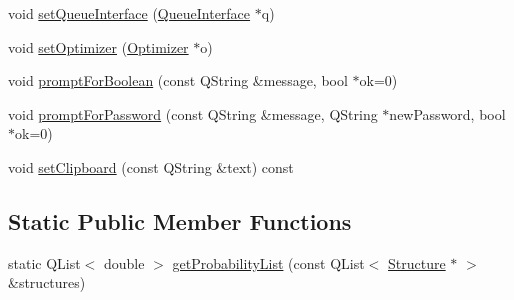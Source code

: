 \begin{DoxyCompactItemize}
\item 
void \hyperlink{classGlobalSearch_1_1OptBase_add9178a3bfd695f1d42191a328956451}{set\+Queue\+Interface} (\hyperlink{classGlobalSearch_1_1QueueInterface}{Queue\+Interface} $\ast$q)
\item 
void \hyperlink{classGlobalSearch_1_1OptBase_addd46a192c8a68553a12b30d18246f1e}{set\+Optimizer} (\hyperlink{classGlobalSearch_1_1Optimizer}{Optimizer} $\ast$o)
\item 
void \hyperlink{classGlobalSearch_1_1OptBase_a3460f008a4a3cc3f8d00b3c0cd531069}{prompt\+For\+Boolean} (const Q\+String \&message, bool $\ast$ok=0)
\item 
void \hyperlink{classGlobalSearch_1_1OptBase_a934195fac431de2882383b0483505c95}{prompt\+For\+Password} (const Q\+String \&message, Q\+String $\ast$new\+Password, bool $\ast$ok=0)
\item 
void \hyperlink{classGlobalSearch_1_1OptBase_a3a509ee5a0aa4d8021dcb2d1bc34f1c1}{set\+Clipboard} (const Q\+String \&text) const 
\end{DoxyCompactItemize}
\subsection*{Static Public Member Functions}
\begin{DoxyCompactItemize}
\item 
static Q\+List$<$ double $>$ \hyperlink{classGlobalSearch_1_1OptBase_a863b23c21cf06829e39420fcc94f0348}{get\+Probability\+List} (const Q\+List$<$ \hyperlink{classGlobalSearch_1_1Structure}{Structure} $\ast$ $>$ \&structures)
\end{DoxyCompactItemize}

